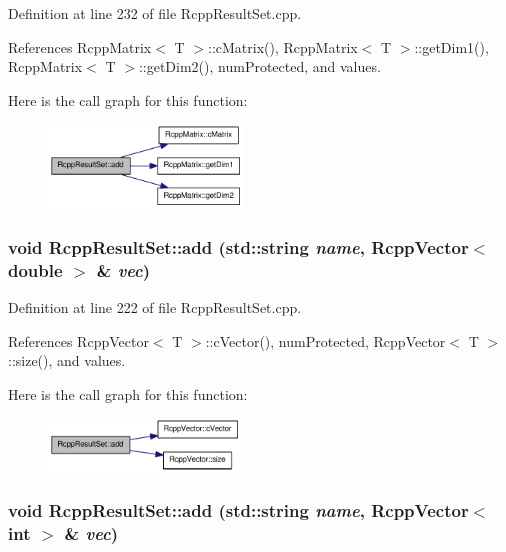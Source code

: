 Definition at line 232 of file RcppResultSet.cpp.

References RcppMatrix$<$ T $>$::cMatrix(), RcppMatrix$<$ T $>$::getDim1(), RcppMatrix$<$ T $>$::getDim2(), numProtected, and values.

Here is the call graph for this function:\nopagebreak
\begin{figure}[H]
\begin{center}
\leavevmode
\includegraphics[width=146pt]{classRcppResultSet_a56f1bff720a6cf6503ab942bdb6892b3_cgraph}
\end{center}
\end{figure}
\hypertarget{classRcppResultSet_a10a64eb042cd3bac5b635670ae2fff5d}{
\subsubsection[{add}]{\setlength{\rightskip}{0pt plus 5cm}void RcppResultSet::add (std::string {\em name}, \/  {\bf RcppVector}$<$ double $>$ \& {\em vec})}}
\label{classRcppResultSet_a10a64eb042cd3bac5b635670ae2fff5d}


Definition at line 222 of file RcppResultSet.cpp.

References RcppVector$<$ T $>$::cVector(), numProtected, RcppVector$<$ T $>$::size(), and values.

Here is the call graph for this function:\nopagebreak
\begin{figure}[H]
\begin{center}
\leavevmode
\includegraphics[width=145pt]{classRcppResultSet_a10a64eb042cd3bac5b635670ae2fff5d_cgraph}
\end{center}
\end{figure}
\hypertarget{classRcppResultSet_a068cb13e27c0e26dd05e92d67eaeb7d0}{
\subsubsection[{add}]{\setlength{\rightskip}{0pt plus 5cm}void RcppResultSet::add (std::string {\em name}, \/  {\bf RcppVector}$<$ int $>$ \& {\em vec})}}
\label{classRcppResultSet_a068cb13e27c0e26dd05e92d67eaeb7d0}


